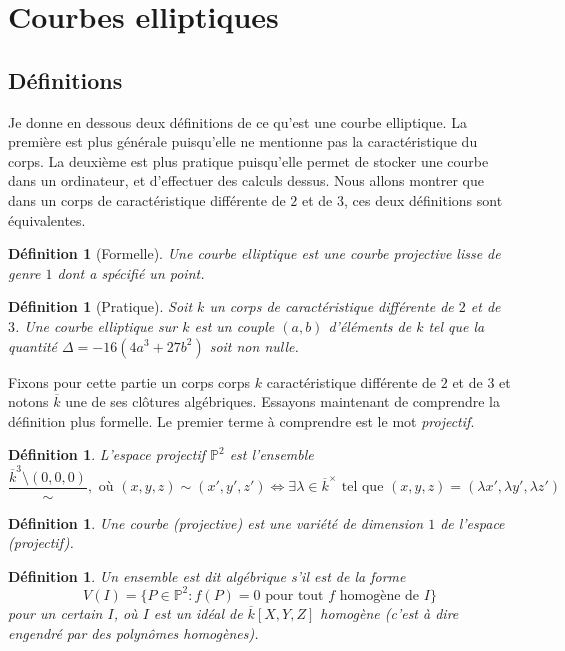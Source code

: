 \documentclass{article}
\theoremstyle{plain}%
\newtheorem{deff}[thm]{Définition}
\theoremstyle{definition}%
\begin{document}
\section{Courbes elliptiques}

\subsection{Définitions}

Je donne en dessous deux définitions de ce qu'est une courbe elliptique. La première est plus générale puisqu'elle ne mentionne pas la  caractéristique du corps. La deuxième est plus pratique puisqu'elle permet de stocker une courbe dans un ordinateur, et d'effectuer des calculs dessus. Nous allons montrer que dans un corps de caractéristique différente de $2$ et de $3$, ces deux définitions sont équivalentes.

\begin{deff}[Formelle]
  Une courbe elliptique est une courbe projective lisse de genre $1$ dont a spécifié un point.
\end{deff}

\begin{deff}[Pratique]
  Soit $k$ un corps de caractéristique différente de $2$ et de $3$. Une courbe elliptique sur $k$ est un couple $(a, b)$ d'éléments de $k$ tel que la quantité $\Delta =-16(4a^3+ 27b^2)$ soit non nulle.
\end{deff}

Fixons pour cette partie un corps corps $k$ caractéristique différente de $2$ et de $3$ et notons $\overline{k}$ une de ses clôtures algébriques. Essayons maintenant de comprendre la définition plus formelle. Le premier terme à comprendre est le mot \emph{projectif}.

\begin{deff}
  L'espace projectif $\mathbb{P}^2$ est l'ensemble $$\frac{\overline{k}^3\setminus(0, 0, 0)}{\sim},\text{\ \ où\ \ } (x, y, z) \sim (x', y', z') \iff \exists \lambda \in \overline{k}^\times \text{ tel que } (x, y, z) = (\lambda x', \lambda y', \lambda z')$$
\end{deff}

\begin{deff}
  Une courbe (projective) est une variété de dimension $1$ de l'espace (projectif).
\end{deff}

\begin{deff}
  Un ensemble est dit algébrique s'il est de la forme $$V(I) = \{ P\in \mathbb{P}^2 : f(P) = 0 \text{ pour tout } f \text{ homogène de } I \}$$ pour un certain $I$, où $I$ est un idéal de $\overline{k}[X, Y, Z]$ homogène (c'est à dire engendré par des polynômes homogènes).
\end{deff}
\end{document}

